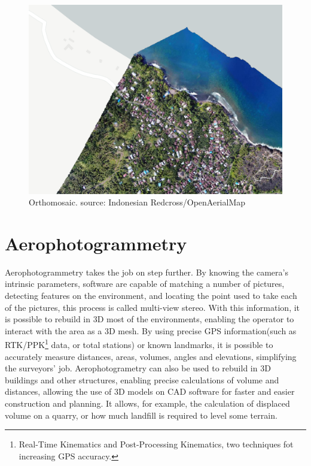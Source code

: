 \begin{figure}
\centering
  \includegraphics[width=\linewidth]{figs/orthomosaic.png}
  \caption{Orthomosaic. source: Indonesian Redcross/OpenAerialMap}
  \label{fig:orthomosaic}
\end{figure}


\section{Aerophotogrammetry}

Aerophotogrammetry takes the job on step further. 
%
By knowing the camera's intrinsic parameters, software are capable of matching a number of pictures, detecting features on the environment, and locating the point used to take each of the pictures, this process is called multi-view stereo. 
%
With this information, it is possible to rebuild in 3D most of the environments, enabling the operator to interact with the area as a 3D mesh.
%
By using precise GPS information(such as RTK/PPK\footnote{Real-Time Kinematics and Post-Processing Kinematics, two techniques fot increasing GPS accuracy.} data, or total stations) or known landmarks, it is possible to accurately measure distances, areas, volumes, angles and elevations, simplifying the surveyors' job.
%
Aerophotogrametry can also be used to rebuild in 3D buildings and other structures, enabling precise calculations of volume and distances, allowing the use of 3D models on CAD software for faster and easier construction and planning.
%
It allows, for example, the calculation of displaced volume on a quarry, or how much landfill is required to level some terrain.
%

